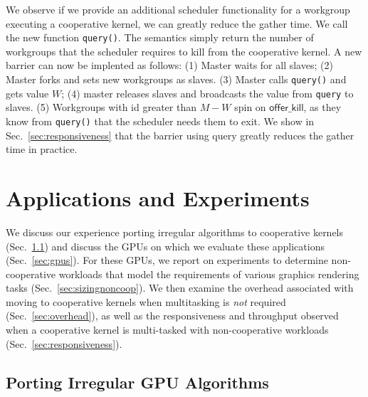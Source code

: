 \documentclass[numbers,nocopyrightspace,10pt]{sigplanconf}
\newcommand{\mysec}{Sec.~}
\newcommand{\offerkill}{\mathsf{offer\_kill}}
\begin{document}
We observe if we provide an additional scheduler functionality for a
workgroup executing a cooperative kernel, we can greatly reduce the
gather time. We call the new function {\tt query()}. The semantics
simply return the number of workgroups that the scheduler requires to
kill from the cooperative kernel. A new barrier can now be implented
as follows: (1) Master waits for all slaves; (2) Master forks and sets
new workgroups as slaves. (3) Master calls {\tt query()} and gets
value $W$; (4) master releases slaves and broadcasts the value from
{\tt query} to slaves. (5) Workgroups with id greater than $M-W$ spin
on $\offerkill$, as they know from {\tt query()} that the scheduler
needs them to exit. We show in \mysec\ref{sec:responsiveness} that the barrier using
query greatly reduces the gather time in practice.



\section{Applications and Experiments}\label{sec:experiments}

We discuss our experience porting irregular algorithms to cooperative kernels (\mysec\ref{sec:portingalgorithms}) and discuss the GPUs on which we evaluate these applications (\mysec\ref{sec:gpus}).  For these GPUs, we report on experiments to determine non-cooperative workloads that model the requirements of various graphics rendering tasks (\mysec\ref{sec:sizingnoncoop}).  We then examine the overhead associated with moving to cooperative kernels when multitasking is \emph{not} required (\mysec\ref{sec:overhead}), as well as the responsiveness and throughput observed when a cooperative kernel is multi-tasked with non-cooperative workloads (\mysec\ref{sec:responsiveness}).

\subsection{Porting Irregular GPU Algorithms}\label{sec:portingalgorithms}
\end{document}
